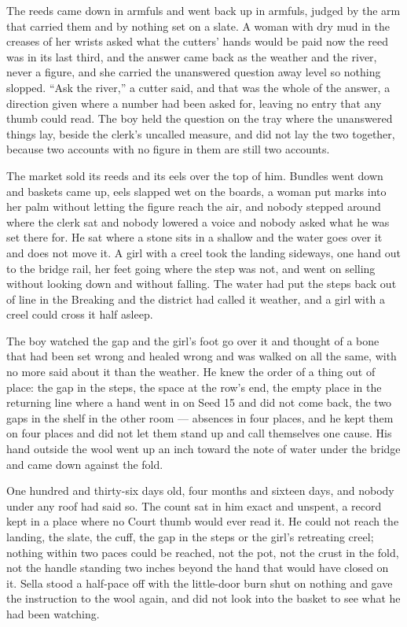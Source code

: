 The reeds came down in armfuls and went back up in armfuls, judged by the arm that carried them and by nothing set on a slate. A woman with dry mud in the creases of her wrists asked what the cutters' hands would be paid now the reed was in its last third, and the answer came back as the weather and the river, never a figure, and she carried the unanswered question away level so nothing slopped. “Ask the river,” a cutter said, and that was the whole of the answer, a direction given where a number had been asked for, leaving no entry that any thumb could read. The boy held the question on the tray where the unanswered things lay, beside the clerk's uncalled measure, and did not lay the two together, because two accounts with no figure in them are still two accounts.

The market sold its reeds and its eels over the top of him. Bundles went down and baskets came up, eels slapped wet on the boards, a woman put marks into her palm without letting the figure reach the air, and nobody stepped around where the clerk sat and nobody lowered a voice and nobody asked what he was set there for. He sat where a stone sits in a shallow and the water goes over it and does not move it. A girl with a creel took the landing sideways, one hand out to the bridge rail, her feet going where the step was not, and went on selling without looking down and without falling. The water had put the steps back out of line in the Breaking and the district had called it weather, and a girl with a creel could cross it half asleep.

The boy watched the gap and the girl's foot go over it and thought of a bone that had been set wrong and healed wrong and was walked on all the same, with no more said about it than the weather. He knew the order of a thing out of place: the gap in the steps, the space at the row's end, the empty place in the returning line where a hand went in on Seed 15 and did not come back, the two gaps in the shelf in the other room --- absences in four places, and he kept them on four places and did not let them stand up and call themselves one cause. His hand outside the wool went up an inch toward the note of water under the bridge and came down against the fold.

One hundred and thirty-six days old, four months and sixteen days, and nobody under any roof had said so. The count sat in him exact and unspent, a record kept in a place where no Court thumb would ever read it. He could not reach the landing, the slate, the cuff, the gap in the steps or the girl's retreating creel; nothing within two paces could be reached, not the pot, not the crust in the fold, not the handle standing two inches beyond the hand that would have closed on it. Sella stood a half-pace off with the little-door burn shut on nothing and gave the instruction to the wool again, and did not look into the basket to see what he had been watching.

